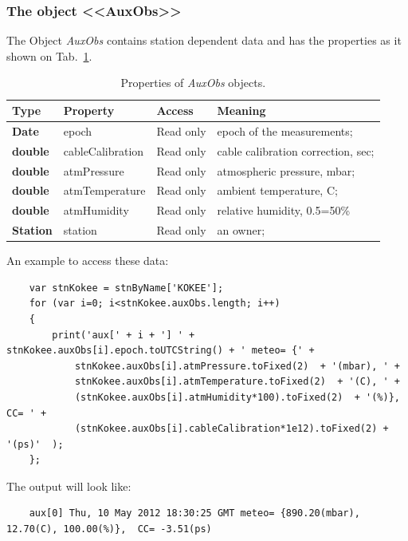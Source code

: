 \documentclass [10pt,letterpaper]{report}
\begin{document}
{\small
\noindent


\subsubsection{The object <<AuxObs>>}
\label{section-scripting-session-auxObj}
The Object {\sl AuxObs} contains station dependent data and has the
properties as it shown on Tab.~\ref{tab-scr-session-station-auxObs}.

\begin{table}[htb]
\centering
\footnotesize
\begin{tabular}{lllp{}}
\hline
Type & Property & Access & Meaning\\
\hline
  {\bf Date}    & epoch           & Read only & epoch of the measurements;\\
  {\bf double}  & cableCalibration& Read only & cable calibration correction, sec;\\
  {\bf double}  & atmPressure     & Read only & atmospheric pressure, mbar;\\
  {\bf double}  & atmTemperature  & Read only & ambient temperature, C;\\
  {\bf double}  & atmHumidity     & Read only & relative humidity, 0.5=50\%\\
  {\bf Station} & station         & Read only & an owner;\\
\hline
\end{tabular}
\caption{Properties of {\sl AuxObs} objects.}
\label{tab-scr-session-station-auxObs}
\end{table}
\noindent
An example to access these data:
{\small\begin{verbatim}
    var stnKokee = stnByName['KOKEE'];
    for (var i=0; i<stnKokee.auxObs.length; i++)
    {
        print('aux[' + i + '] ' + stnKokee.auxObs[i].epoch.toUTCString() + ' meteo= {' +
            stnKokee.auxObs[i].atmPressure.toFixed(2)  + '(mbar), ' +
            stnKokee.auxObs[i].atmTemperature.toFixed(2)  + '(C), ' +
            (stnKokee.auxObs[i].atmHumidity*100).toFixed(2)  + '(%)},  CC= ' +
            (stnKokee.auxObs[i].cableCalibration*1e12).toFixed(2) + '(ps)'  );
    };
\end{verbatim}}
\noindent
The output will look like:
{\small\begin{verbatim}
    aux[0] Thu, 10 May 2012 18:30:25 GMT meteo= {890.20(mbar), 12.70(C), 100.00(%)},  CC= -3.51(ps)

\end{verbatim}}}
\end{document}
